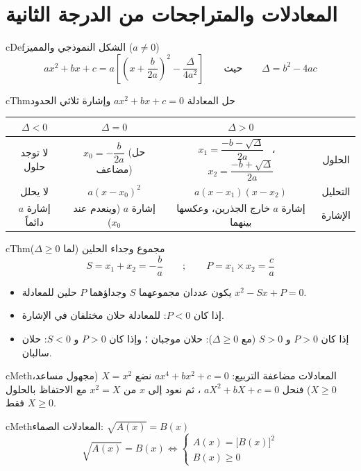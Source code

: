 \documentclass[12pt,a4paper]{article}
\newenvironment{BOX}[2]{\begin{otherlanguage}{english}\begin{arbox}{#1}{#2}}{\end{arbox}\end{otherlanguage}}
\newenvironment{tarif}[1][تعريف]{\begin{BOX}{cDef}{#1}}{\end{BOX}}
\newenvironment{khassia}[1][خاصية]{\begin{BOX}{cThm}{#1}}{\end{BOX}}
\newenvironment{tariqa}[1][طريقة]{\begin{BOX}{cMeth}{#1}}{\end{BOX}}
\begin{document}
\section{المعادلات والمتراجحات من الدرجة الثانية}
\begin{tarif}[الشكل النموذجي والمميز ($a\neq0$)]
\[ax^2+bx+c=a\left[\left(x+\frac{b}{2a}\right)^2-\frac{\Delta}{4a^2}\right]\qquad\text{حيث}\qquad \Delta=b^2-4ac\]
\end{tarif}
\begin{khassia}[حل المعادلة $ax^2+bx+c=0$ وإشارة ثلاثي الحدود]
\begin{center}
\renewcommand{\arraystretch}{1.7}
\begin{tabular}{|C|C|C|C|}\hline
 $\Delta<0$ & $\Delta=0$ & $\Delta>0$ & \\\hline
لا توجد حلول & $x_0=-\dfrac{b}{2a}$ (حل مضاعف) & $x_1=\dfrac{-b-\sqrt\Delta}{2a}$ \ ، \ $x_2=\dfrac{-b+\sqrt\Delta}{2a}$ & الحلول\\\hline
لا يحلل & $a(x-x_0)^2$ & $a(x-x_1)(x-x_2)$ & التحليل\\\hline
إشارة $a$ دائماً & إشارة $a$ (وينعدم عند $x_0$) & إشارة $a$ خارج الجذرين، وعكسها بينهما & الإشارة\\\hline
\end{tabular}
\end{center}
\end{khassia}
\begin{khassia}[مجموع وجداء الحلين (لما $\Delta\ge0$)]
\[S=x_1+x_2=-\frac ba\qquad;\qquad P=x_1\times x_2=\frac ca\]
\begin{itemize}
\item يكون عددان مجموعهما $S$ وجداؤهما $P$ حلين للمعادلة $x^2-Sx+P=0$.
\item إذا كان $P<0$: للمعادلة حلان مختلفان في الإشارة.
\item إذا كان $P>0$ و $S>0$ (مع $\Delta\ge0$): حلان موجبان ؛ وإذا كان $P>0$ و $S<0$: حلان سالبان.
\end{itemize}
\end{khassia}
\begin{tariqa}[المعادلات مضاعفة التربيع: $ax^4+bx^2+c=0$]
نضع $X=x^2$ (مجهول مساعد، $X\ge0$) فنحل $aX^2+bX+c=0$ ، ثم نعود إلى $x$ من $x^2=X$ مع الاحتفاظ بالحلول $X\ge0$ فقط.
\end{tariqa}
\begin{tariqa}[المعادلات الصماء: $\sqrt{A(x)}=B(x)$]
\[\sqrt{A(x)}=B(x)\iff\begin{cases}A(x)=\big[B(x)\big]^2\\ B(x)\ge0\end{cases}\]
\end{tariqa}
\end{document}
